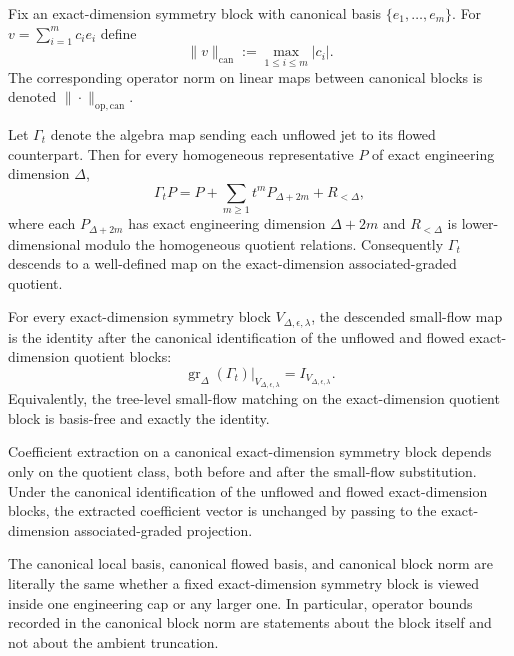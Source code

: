 \begin{definition}
Fix an exact-dimension symmetry block with canonical basis $\{e_1,\dots,e_m\}$. For $v=\sum_{i=1}^m c_i e_i$ define
\[
\|v\|_{\mathrm{can}}:=\max_{1\le i\le m}|c_i|.
\]
The corresponding operator norm on linear maps between canonical blocks is denoted $\|\cdot\|_{\mathrm{op,can}}$.
\end{definition}

\begin{lemma}
Let $\Gamma_t$ denote the algebra map sending each unflowed jet to its flowed counterpart. Then for every homogeneous representative $P$ of exact engineering dimension $\Delta$,
\[
\Gamma_t P = P + \sum_{m\ge 1} t^m P_{\Delta+2m} + R_{<\Delta},
\]
where each $P_{\Delta+2m}$ has exact engineering dimension $\Delta+2m$ and $R_{<\Delta}$ is lower-dimensional modulo the homogeneous quotient relations. Consequently $\Gamma_t$ descends to a well-defined map on the exact-dimension associated-graded quotient.
\end{lemma}

\begin{theorem}
For every exact-dimension symmetry block $V_{\Delta,\epsilon,\lambda}$, the descended small-flow map is the identity after the canonical identification of the unflowed and flowed exact-dimension quotient blocks:
\[
\operatorname{gr}_\Delta(\Gamma_t)\big|_{V_{\Delta,\epsilon,\lambda}} = I_{V_{\Delta,\epsilon,\lambda}}.
\]
Equivalently, the tree-level small-flow matching on the exact-dimension quotient block is basis-free and exactly the identity.
\end{theorem}

\begin{lemma}
Coefficient extraction on a canonical exact-dimension symmetry block depends only on the quotient class, both before and after the small-flow substitution. Under the canonical identification of the unflowed and flowed exact-dimension blocks, the extracted coefficient vector is unchanged by passing to the exact-dimension associated-graded projection.
\end{lemma}

\begin{lemma}
The canonical local basis, canonical flowed basis, and canonical block norm are literally the same whether a fixed exact-dimension symmetry block is viewed inside one engineering cap or any larger one. In particular, operator bounds recorded in the canonical block norm are statements about the block itself and not about the ambient truncation.
\end{lemma}

